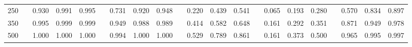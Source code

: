 % 
\begin{tabular}{ccccccccccccccccccccc}
  \hline
  \hline
250 &  & 0.930 & 0.991 & 0.995 &  & 0.731 & 0.920 & 0.948 &  & 0.220 & 0.439 & 0.541 &  & 0.065 & 0.193 & 0.280 &  & 0.570 & 0.834 & 0.897 \\ 
  350 &  & 0.995 & 0.999 & 0.999 &  & 0.949 & 0.988 & 0.989 &  & 0.414 & 0.582 & 0.648 &  & 0.161 & 0.292 & 0.351 &  & 0.871 & 0.949 & 0.978 \\ 
  500 &  & 1.000 & 1.000 & 1.000 &  & 0.994 & 1.000 & 1.000 &  & 0.529 & 0.789 & 0.861 &  & 0.161 & 0.373 & 0.500 &  & 0.965 & 0.995 & 0.997 \\ 
   \hline
\end{tabular}
